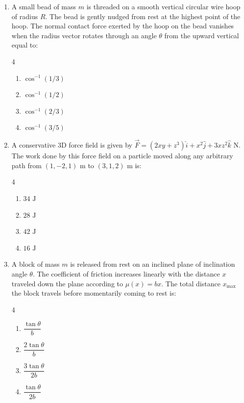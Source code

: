 \documentclass[11pt,a4paper]{article}
\begin{document}
\begin{enumerate}[label=\textbf{\arabic*.},leftmargin=18pt,itemsep=8pt,resume]
  \item A small bead of mass $m$ is threaded on a smooth vertical circular wire hoop of radius $R$. The bead is gently nudged from rest at the highest point of the hoop. The normal contact force exerted by the hoop on the bead vanishes when the radius vector rotates through an angle $\theta$ from the upward vertical equal to:
  \begin{multicols}{4}
    \begin{enumerate}[label=(\Alph*)]
      \item $\cos^{-1}(1/3)$
      \item $\cos^{-1}(1/2)$
      \item $\cos^{-1}(2/3)$
      \item $\cos^{-1}(3/5)$
    \end{enumerate}
  \end{multicols}

  \item A conservative 3D force field is given by $\vec{F} = (2xy + z^3)\hat{i} + x^2\hat{j} + 3xz^2\hat{k}\text{ N}$. The work done by this force field on a particle moved along any arbitrary path from $(1, -2, 1)\text{ m}$ to $(3, 1, 2)\text{ m}$ is:
  \begin{multicols}{4}
    \begin{enumerate}[label=(\Alph*)]
      \item $34\text{ J}$
      \item $28\text{ J}$
      \item $42\text{ J}$
      \item $16\text{ J}$
    \end{enumerate}
  \end{multicols}

  \item A block of mass $m$ is released from rest on an inclined plane of inclination angle $\theta$. The coefficient of friction increases linearly with the distance $x$ traveled down the plane according to $\mu(x) = bx$. The total distance $x_{\max}$ the block travels before momentarily coming to rest is:
  \begin{multicols}{4}
    \begin{enumerate}[label=(\Alph*)]
      \item $\dfrac{\tan\theta}{b}$
      \item $\dfrac{2\tan\theta}{b}$
      \item $\dfrac{3\tan\theta}{2b}$
      \item $\dfrac{\tan\theta}{2b}$
    \end{enumerate}
  \end{multicols}


\end{enumerate}
\end{document}
